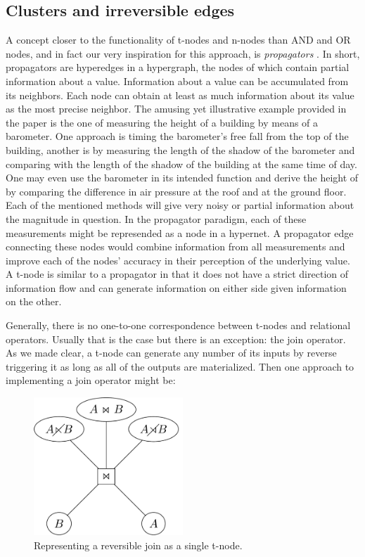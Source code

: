 \subsection{Clusters and irreversible edges}

A concept closer to the
functionality of t-nodes and n-nodes than AND and OR nodes, 
and in fact our very inspiration
for this approach, is \emph{propagators}
\cite{radulPropagationNetworksFlexible2009a}. In short, propagators are
hyperedges in a hypergraph, the nodes of which contain partial
information about a value. Information about a value can be
accumulated from its neighbors. Each node can obtain at least as much
information about its value as the most precise neighbor. The amusing
yet illustrative example provided in the paper is the one of measuring
the height of a building by means of a barometer. One approach is
timing the barometer's free fall from the top of the building, another
is by measuring the length of the shadow of the barometer and
comparing with the length of the shadow of the building at the same
time of day. One may even use the barometer in its intended function
and derive the height of by comparing the difference in air pressure
at the roof and at the ground floor. Each of the mentioned methods
will give very noisy or partial information about the magnitude in
question. In the propagator paradigm, each of these measurements might
be represended as a node in a hypernet. A propagator edge connecting
these nodes would combine information from all measurements and
improve each of the nodes' accuracy in their perception of the
underlying value. A t-node is similar to a propagator in that it does
not have a strict direction of information flow and can generate
information on either side given information on the other.

Generally, there is no one-to-one correspondence between
t-nodes and relational operators. Usually that is the case but
there is an exception: the join operator. As we made clear, a t-node
can generate any number of its inputs by reverse triggering it as
long as all of the outputs are materialized. Then one approach to
implementing a join operator might be:

\begin{figure}[H]
  \centering
  \includegraphics[width=0.5\textwidth]{./imgs/naivejoinnet.pdf}
  \caption{\label{fig:org78bb458}Representing a reversible join as a single t-node.}
\end{figure}

